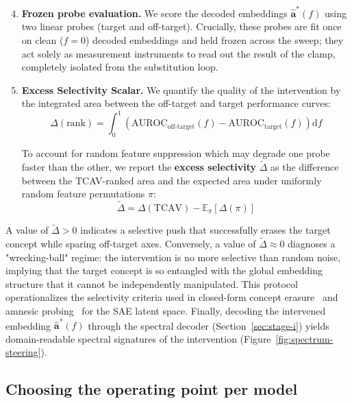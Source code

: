 \documentclass{article}
\begin{document}
\begin{enumerate} 
\setcounter{enumi}{3}
    \item \textbf{Frozen probe evaluation.} We score the decoded embeddings $\hat{\mathbf{a}}^*(f)$ using two linear probes (target and off-target). Crucially, these probes are fit once on clean ($f=0$) decoded embeddings and held frozen across the sweep; they act solely as measurement instruments to read out the result of the clamp, completely isolated from the substitution loop.
    
    \item \textbf{Excess Selectivity Scalar.} We quantify the quality of the intervention by the integrated area between the off-target and target performance curves:
    \begin{equation}
        \Delta(\text{rank}) = \int_0^1 \left( \mathrm{AUROC}_{\text{off-target}}(f) - \mathrm{AUROC}_{\text{target}}(f) \right) \mathrm{d}f
    \label{eq:selectivity}
    \end{equation}
    
    To account for random feature suppression which may degrade one probe faster than the other, we report the \textbf{excess selectivity} $\tilde{\Delta}$ as the difference between the TCAV-ranked area and the expected area under uniformly random feature permutations $\pi$:
    \begin{equation}
        \tilde{\Delta} = \Delta(\text{TCAV}) - \mathbb{E}_{\pi}[\Delta(\pi)]
    \label{eq:excess_selectivity}
    \end{equation}
\end{enumerate}

A value of $\tilde{\Delta} > 0$ indicates a selective push that successfully erases the target concept while sparing off-target axes. Conversely, a value of $\tilde{\Delta} \approx 0$ diagnoses a "wrecking-ball" regime: the intervention is no more selective than random noise, implying that the target concept is so entangled with the global embedding structure that it cannot be independently manipulated. This protocol operationalizes the selectivity criteria used in closed-form concept erasure~\cite{belrose2023leace} and amnesic probing~\cite{elazar2021amnesic} for the SAE latent space. Finally, decoding the intervened embedding $\hat{\mathbf{a}}^*(f)$ through the spectral decoder (Section~\ref{sec:stage-i}) yields domain-readable spectral signatures of the intervention (Figure~\ref{fig:spectrum-steering}).


\subsection{Choosing the operating point per model}
\label{sec:operating-point}
\end{document}
